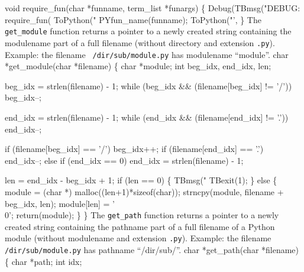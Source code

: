 void require_fun(char *funname, term_list *funargs) \{
  Debug(TBmsg("DEBUG: require_fun(%
  ToPython("%
  PYfun_name(funname);
  ToPython("',%
\}
\nwendcode{}\nwdocspar
The \texttt{get\_module} function returns a pointer to a newly created
string containing the modulename part of a full filename (without
directory and extension \texttt{.py}).  Example: the filename {\tt
  /dir/sub/module.py} has modulename ``module''.
\nwenddocs{}\plusendmoddef\nwstartdeflinemarkup{}\nwenddeflinemarkup
char *get_module(char *filename) \{
  char *module;
  int beg_idx, end_idx, len;

  beg_idx = strlen(filename) - 1;
  while (beg_idx && (filename[beg_idx] != '/')) beg_idx--;

  end_idx = strlen(filename) - 1;
  while (end_idx && (filename[end_idx] != '.')) end_idx--;

  if (filename[beg_idx] == '/') beg_idx++;
  if (filename[end_idx] == '.') end_idx--;
  else if (end_idx == 0)          end_idx = strlen(filename) - 1;

  len = end_idx - beg_idx + 1;
  if (len == 0) \{
    TBmsg("%
    TBexit(1);
  \} else \{
    module = (char *) malloc((len+1)*sizeof(char));
    strncpy(module, filename + beg_idx, len);
    module[len] = '\\0';
    return(module);
  \}
\}
\nwendcode{}\nwdocspar
The \texttt{get\_path} function returns a pointer to a newly created
string containing the pathname part of a full filename of a Python
module (without modulename and extension \texttt{.py}). Example: the
filename \texttt{/dir/sub/module.py} has pathname ``/dir/sub/''.
\nwenddocs{}\plusendmoddef\nwstartdeflinemarkup{}\nwenddeflinemarkup
char *get_path(char *filename) \{
  char *path;
  int idx;  
  

